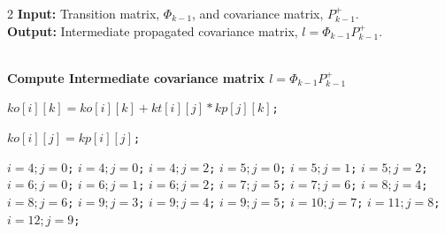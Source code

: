 \documentclass[journal]{IEEEtran}
\begin{document}
\begin{tcolorbox}[float*=!tbph]
\begin{algorithm}[H]
\caption{Efficient propagation of the error covariance matrix (part a)}
\begin{multicols}{2}
 \hspace*{\algorithmicindent} \textbf{Input:} Transition matrix, $\Phi_{k-1}$, and covariance matrix, $P_{k-1}^+$.\\
 \hspace*{\algorithmicindent} \textbf{Output:} Intermediate propagated covariance matrix, $l=\Phi_{k-1} P_{k-1}^+$. 
\begin{algorithmic}[1]
\\\textbf{\color{Red}Compute Intermediate covariance matrix $l=\Phi_{k-1} P_{k-1}^+$}\\

        \State \texttt{$ko[i][k] = ko[i][k] + kt[i][j] * kp[j][k]$;}
      \EndFor
\EndFunction
\\

        \State \texttt{$ko[i][j] = kp[i][j]$;}
      \EndFor
      \EndFor

\State \texttt{$i=4;j=0$;}
\State \texttt{$i=4;j=0$;}
\State \texttt{$i=4;j=2$;}
\State \texttt{$i=5;j=0$;}
\State \texttt{$i=5;j=1$;}
\State \texttt{$i=5;j=2$;}
\State \texttt{$i=6;j=0$;}
\State \texttt{$i=6;j=1$;}
\State \texttt{$i=6;j=2$;}
\State \texttt{$i=7;j=5$;}
\State \texttt{$i=7;j=6$;}
\State \texttt{$i=8;j=4$;}
\State \texttt{$i=8;j=6$;}
\State \texttt{$i=9;j=3$;}
\State \texttt{$i=9;j=4$;}
\State \texttt{$i=9;j=5$;}
\State \texttt{$i=10;j=7$;}
\State \texttt{$i=11;j=8$;}
\State \texttt{$i=12;j=9$;}
\EndFunction
\end{algorithmic}
\end{multicols}
\label{inter1}
\end{algorithm}

\end{tcolorbox}
\end{document}
